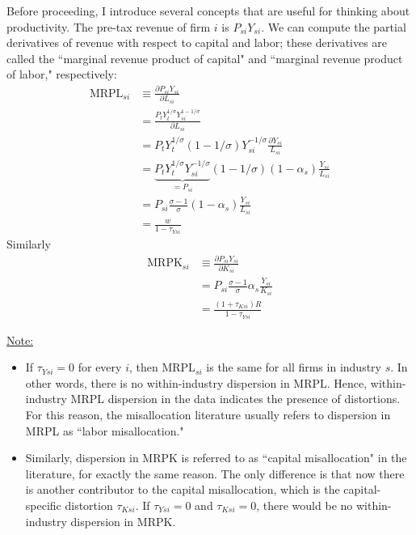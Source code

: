 \documentclass[12pt]{article}
\begin{document}
		Before proceeding, I introduce several concepts that are useful for thinking about productivity. The pre-tax revenue of firm $i$ is $P_{si} Y_{si}$. We can compute the partial derivatives of revenue with respect to capital and labor; these derivatives are called the ``marginal revenue product of capital" and ``marginal revenue product of labor," respectively:
	\begin{align}
		\text{MRPL}_{si} & \equiv \frac{\partial P_{si} Y_{si}}{\partial L_{si}} \nonumber \\
		& = \frac{P_t Y_t^{1/\sigma} Y_{si}^{1-1/\sigma}}{\partial L_{si}} \nonumber \\
		& = P_t Y_t^{1/\sigma} \left(1-1/\sigma\right) Y_{si}^{-1/\sigma} \frac{\partial Y_{si}}{L_{si}} \nonumber \\
		& = \underbrace{P_t Y_t^{1/\sigma}  Y_{si}^{-1/\sigma}}_{= P_{si}}\left(1-1/\sigma\right) (1-\alpha_s) \frac{Y_{si}}{L_{si}} \nonumber \\
		& = P_{si} \frac{\sigma -1}{\sigma} (1-\alpha_s) \frac{Y_{si}}{L_{si}} \nonumber \\
		& = \frac{w}{1-\tau_{Ysi}}
	\end{align}
	Similarly
	\begin{align}
		\text{MRPK}_{si} & \equiv \frac{\partial P_{si} Y_{si}}{\partial K_{si}} \nonumber \\
		& = P_{si} \frac{\sigma-1}{\sigma} \alpha_s \frac{Y_{si}}{K_{si}} \nonumber \\
		& = \frac{(1+\tau_{Ksi})R}{1-\tau_{Ysi}}
	\end{align}

\underline{Note:}
\begin{itemize}
		\item If $\tau_{Ysi} = 0$ for every $i$, then $\text{MRPL}_{si}$ is the same for all firms in industry $s$. In other words, there is no within-industry dispersion in $\text{MRPL}$. Hence, within-industry MRPL dispersion in the data indicates the presence of distortions. For this reason, the misallocation literature usually refers to dispersion in MRPL as ``labor misallocation."
	\item Similarly, dispersion in MRPK is referred to as ``capital misallocation" in the literature, for exactly the same reason. The only difference is that now there is another contributor to the capital misallocation, which is the capital-specific distortion $\tau_{Ksi}$. If $\tau_{Ysi} = 0$ and $\tau_{Ksi} = 0$, there would be no within-industry dispersion in MRPK. 
\end{itemize}
\end{document}
